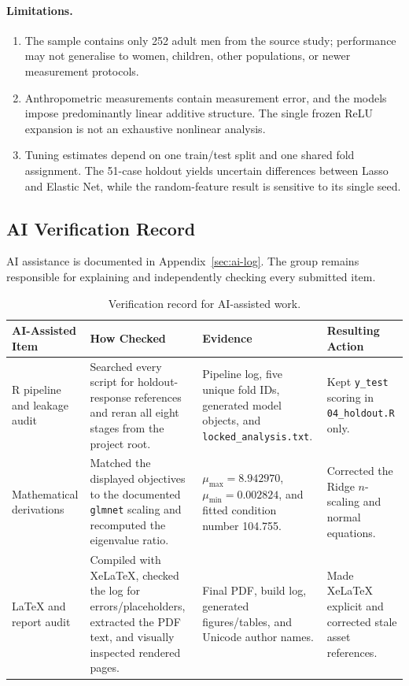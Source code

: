 \paragraph{Limitations.}
\begin{enumerate}
 \item The sample contains only 252 adult men from the source study; performance
       may not generalise to women, children, other populations, or newer
       measurement protocols.
 \item Anthropometric measurements contain measurement error, and the models
       impose predominantly linear additive structure.  The single frozen ReLU
       expansion is not an exhaustive nonlinear analysis.
 \item Tuning estimates depend on one train/test split and one shared fold
       assignment.  The 51-case holdout yields uncertain differences between
       Lasso and Elastic Net, while the random-feature result is sensitive to
       its single seed.
\end{enumerate}

\subsection{AI Verification Record}
\label{sec:ai-verification}

AI assistance is documented in Appendix~\ref{sec:ai-log}.  The group remains
responsible for explaining and independently checking every submitted item.

\begin{table}[H]
\centering
\small
\caption{Verification record for AI-assisted work.}
\label{tab:ai-verification}
\begin{tabularx}{\textwidth}{>{\raggedright\arraybackslash}p{} X X
  >{\raggedright\arraybackslash}p{}}
\toprule
\textbf{AI-Assisted Item} & \textbf{How Checked} & \textbf{Evidence} &
\textbf{Resulting Action} \\
\midrule
R pipeline and leakage audit &
Searched every script for holdout-response references and reran all eight
stages from the project root. &
Pipeline log, five unique fold IDs, generated model objects, and
\texttt{locked\_analysis.txt}. &
Kept \texttt{y\_test} scoring in \texttt{04\_holdout.R} only. \\[4pt]
Mathematical derivations &
Matched the displayed objectives to the documented \texttt{glmnet} scaling and
recomputed the eigenvalue ratio. &
$\mu_{\max}=8.942970$, $\mu_{\min}=0.002824$, and fitted condition number
104.755. &
Corrected the Ridge $n$-scaling and normal equations. \\[4pt]
LaTeX and report audit &
Compiled with XeLaTeX, checked the log for errors/placeholders, extracted the
PDF text, and visually inspected rendered pages. &
Final PDF, build log, generated figures/tables, and Unicode author names. &
Made XeLaTeX explicit and corrected stale asset references. \\
\bottomrule
\end{tabularx}
\end{table}
